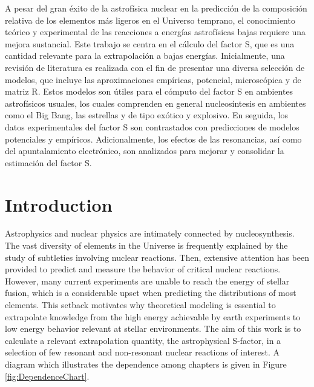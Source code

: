 \documentclass[openany]{book}
\begin{document}
A pesar del gran éxito de la astrofísica nuclear en la predicción de la composición relativa de los elementos más ligeros en el Universo temprano, el conocimiento teórico y experimental de las reacciones a energías astrofísicas bajas requiere una mejora sustancial. Este trabajo se centra en el cálculo del factor S, que es una cantidad relevante para la extrapolación a bajas energías. Inicialmente, una revisión de literatura es realizada con el fin de presentar una diversa selección de modelos, que incluye las aproximaciones empíricas, potencial, microscópica y de matriz R. Estos modelos son útiles para el cómputo del factor S en ambientes astrofísicos usuales, los cuales comprenden en general nucleosíntesis en ambientes como el Big Bang, las estrellas y de tipo exótico y explosivo. En seguida, los datos experimentales del factor S son contrastados con predicciones de modelos potenciales y empíricos. Adicionalmente, los efectos de las resonancias, así como del apuntalamiento electrónico, son analizados para mejorar y consolidar la estimación del factor S. \\

	
	
\clearpage

\tableofcontents
\listoffigures
\listoftables



\chapter*{Introduction}

Astrophysics and nuclear physics are intimately connected by nucleosynthesis. The vast diversity of elements in the Universe is frequently explained by the study of subtleties involving nuclear reactions. Then, extensive attention has been provided to predict and measure the behavior of critical nuclear reactions. However, many current experiments are unable to reach the energy of stellar fusion, which is a considerable upset when predicting the distributions of most elements. This setback motivates why theoretical modeling is essential to extrapolate knowledge from the high energy achievable by earth experiments to low energy behavior relevant at stellar environments. The aim of this work is to calculate a relevant extrapolation quantity, the astrophysical S-factor, in a selection of few resonant and non-resonant nuclear reactions of interest. A diagram which illustrates the dependence among chapters is given in Figure \ref{fig:DependenceChart}. \\
\end{document}
